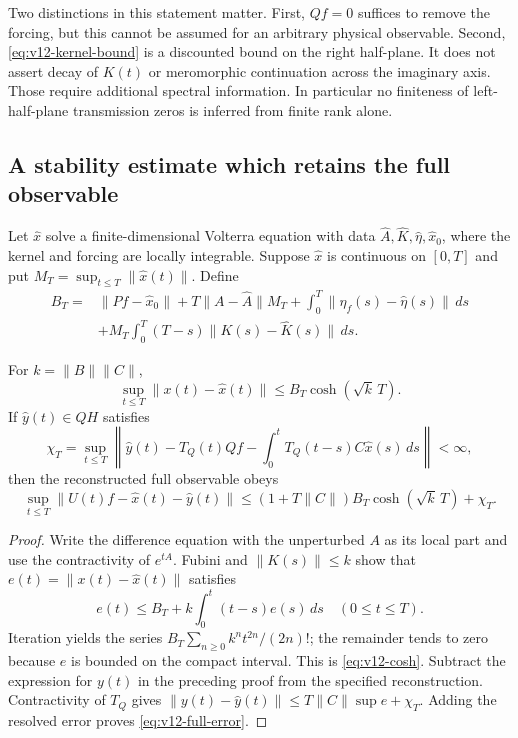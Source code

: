 Two distinctions in this statement matter. First, $Qf=0$ suffices to
remove the forcing, but this cannot be assumed for an arbitrary physical
observable. Second, \eqref{eq:v12-kernel-bound} is a discounted bound on
the right half-plane. It does not assert decay of $K(t)$ or meromorphic
continuation across the imaginary axis. Those require additional
spectral information. In particular no finiteness of left-half-plane
transmission zeros is inferred from finite rank alone.

\subsection{A stability estimate which retains the full observable}
Let $\widehat x$ solve a finite-dimensional Volterra equation with data
$\widehat A,\widehat K,\widehat\eta,\widehat x_0$, where the kernel and
forcing are locally integrable. Suppose $\widehat x$ is continuous on
$[0,T]$ and put $M_T=\sup_{t\le T}\|\widehat x(t)\|$. Define
\begin{align}
 B_T={}&\|Pf-\widehat x_0\|+T\|A-\widehat A\|M_T
       +\int_0^T\|\eta_f(s)-\widehat\eta(s)\|\,ds\nonumber\\
 &+M_T\int_0^T(T-s)\|K(s)-\widehat K(s)\|\,ds.
 \label{eq:v12-BT}
\end{align}

\begin{proposition}
\label{prop:v12-stability}
For $k=\|B\|\|C\|$,
\begin{equation}
 \sup_{t\le T}\|x(t)-\widehat x(t)\|
       \le B_T\cosh(\sqrt{k}\,T).
 \label{eq:v12-cosh}
\end{equation}
If $\widehat y(t)\in QH$ satisfies
\[
 \chi_T=\sup_{t\le T}
 \left\|\widehat y(t)-T_Q(t)Qf
               -\int_0^t T_Q(t-s)C\widehat x(s)\,ds\right\|<\infty,
\]
then the reconstructed full observable obeys
\begin{equation}
 \sup_{t\le T}\|U(t)f-\widehat x(t)-\widehat y(t)\|
 \le (1+T\|C\|)B_T\cosh(\sqrt{k}\,T)+\chi_T.
 \label{eq:v12-full-error}
\end{equation}
\end{proposition}

\begin{proof}
Write the difference equation with the unperturbed $A$ as its local
part and use the contractivity of $e^{tA}$. Fubini and
$\|K(s)\|\le k$ show that $e(t)=\|x(t)-\widehat x(t)\|$ satisfies
\[
 e(t)\le B_T+k\int_0^t(t-s)e(s)\,ds\quad(0\le t\le T).
\]
Iteration yields the series
$B_T\sum_{n\ge0}k^n t^{2n}/(2n)!$; the remainder tends to zero because
$e$ is bounded on the compact interval. This is \eqref{eq:v12-cosh}.
Subtract the expression for $y(t)$ in the preceding proof from the
specified reconstruction. Contractivity of $T_Q$ gives
$\|y(t)-\widehat y(t)\|\le T\|C\|\sup e+\chi_T$.
Adding the resolved error proves \eqref{eq:v12-full-error}.
\end{proof}

